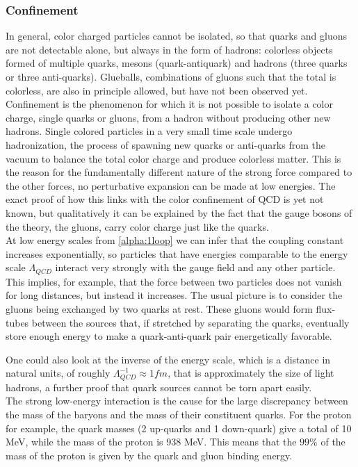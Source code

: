 \subsubsection{Confinement}
In general, color charged particles cannot be isolated, so that quarks and gluons are not detectable alone, but always in the form of hadrons: colorless objects formed of multiple quarks, mesons (quark-antiquark) and hadrons (three quarks or three anti-quarks). Glueballs, combinations of gluons such that the total is colorless, are also in principle allowed, but have not been observed yet. Confinement is the phenomenon for which it is not possible to isolate a color charge, single quarks or gluons, from a hadron without producing other new hadrons. Single colored particles in a very small time scale undergo hadronization, the process of spawning new quarks or anti-quarks from the vacuum to balance the total color charge and produce colorless matter. This is the reason for the fundamentally different nature of the strong force compared to the other forces, no perturbative expansion can be made at low energies. The exact proof of how this links with the color confinement of QCD is yet not known, but qualitatively it can be explained by the fact that the gauge bosons of the theory, the gluons, carry color charge just like the quarks. \\
At low energy scales from \cref{alpha:1loop} we can infer that the coupling constant increases exponentially, so particles that have energies comparable to the energy scale $\Lambda_{QCD}$ interact very strongly with the gauge field and any other particle. This implies, for example, that the force between two particles does not vanish for long distances, but instead it increases. The usual picture is to consider the gluons being exchanged by two quarks at rest. These gluons would form flux-tubes between the sources that, if stretched by separating the quarks, eventually store enough energy to make a quark-anti-quark pair energetically favorable. 

One could also look at the inverse of the energy scale, which is a distance in natural units, of roughly $\Lambda_{QCD}^{-1} \approx 1 fm$, that is approximately the size of light hadrons, a further proof that quark sources cannot be torn apart easily.\\
The strong low-energy interaction is the cause for the large discrepancy between the mass of the baryons and the mass of their constituent quarks. For the proton for example, the quark masses (2 up-quarks and 1 down-quark) give a total of 10 MeV, while the mass of the proton is 938 MeV. This means that the $99\%$ of the mass of the proton is given by the quark and gluon binding energy.

